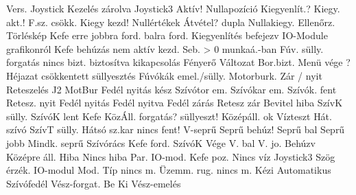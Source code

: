 \startsetups [VpHUNGARIAN]
 {Vers.}
 {Joystick}
 {Kezelés}
 {zárolva}
 {Joystick3}
 {Aktív!}
 {Nullapozíció}
 {Kiegyenlít.?}
 {Kiegy. akt.!}
 {F.sz. csökk.}
 {Kiegy kezd!}
 {Nullértékek}
 {Átvétel?}
 {dupla}
 {Nullakiegy.}
 {Ellenőrz.}
 {Törléskép}
 {Kefe erre}
 {jobbra ford.}
 {balra ford.}
 {Kiegyenlítés}
 {befejezv}
 {IO-Module}
 {grafikonról}
 {Kefe behúzás}
 {nem aktív}
 {kezd.}
 {Seb. > 0}
 {munkaá.-ban}
 {Fúv. sülly.}
 {forgatás}
 {nincs bizt.}
 {biztosítva}
 {kikapcsolás}
 {Fényerő}
 {Változat}
 {Bor.bizt.}
 {Menü vége ?}
 {Héjazat}
 {csökkentett}
 {süllyesztés}
 {Fúvókák}
 {emel./sülly.}
 {Motorburk.}
 {Zár / nyit}
 {Reteszelés}
 {J2 MotBur}
 {Fedél nyitás}
 {kész}
 {Szívótor em.}
 {Szívókar em.}
 {Szívók. fent}
 {Retesz. nyit}
 {Fedél nyitás}
 {Fedél nyitva}
 {Fedél zárás}
 {Retesz zár}
 {Bevitel hiba}
 {SzívK sülly.}
 {SzívóK lent}
 {Kefe KözÁll.}
 {forgatás?}
 {süllyeszt!}
 {Középáll. ok}
 {Vízteszt}
 {Hát. szívó}
 {SzívT sülly.}
 {Hátsó sz.kar}
 {nincs fent!}
 {V-seprű}
 {Seprű behúz!}
 {Seprű bal}
 {Seprű jobb}
 {Mindk. seprű}
 {Szívórács}
 {Kefe ford.}
 {SzívóK Vége}
 {V. bal}
 {V. jo.}
 {Behúzv}
 {Középre áll.}
 {Hiba}
 {Nincs hiba}
 {Par. IO-mod.}
 {Kefe poz.}
 {Nincs víz}
 {Joystick3}
 {Szög érzék.}
 {IO-modul}
 {Mod. Típ}
 {nincs m.}
 {Üzemm. rug.}
 {nincs m.}
 {Kézi}
 {Automatikus}
 {Szívófedél}
 {Vész-forgat.}
 {Be}
 {Ki}
 {Vész-emelés}

